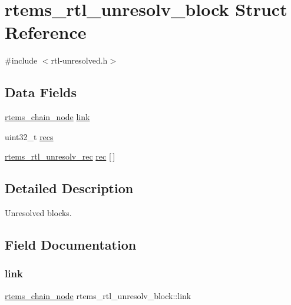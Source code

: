 \hypertarget{structrtems__rtl__unresolv__block}{}\section{rtems\+\_\+rtl\+\_\+unresolv\+\_\+block Struct Reference}
\label{structrtems__rtl__unresolv__block}


{\ttfamily \#include $<$rtl-\/unresolved.\+h$>$}

\subsection*{Data Fields}
\begin{DoxyCompactItemize}
\item 
\mbox{\hyperlink{structChain__Node__struct}{rtems\+\_\+chain\+\_\+node}} \mbox{\hyperlink{structrtems__rtl__unresolv__block_aee34f039d1efe2f7b54da7fd18c033e1}{link}}
\item 
uint32\+\_\+t \mbox{\hyperlink{structrtems__rtl__unresolv__block_aa0fc428e43fb0926b0ac6523b8279b94}{recs}}
\item 
\mbox{\hyperlink{structrtems__rtl__unresolv__rec}{rtems\+\_\+rtl\+\_\+unresolv\+\_\+rec}} \mbox{\hyperlink{structrtems__rtl__unresolv__block_ac222487664347952eab3ab119e8a6b63}{rec}} \mbox{[}$\,$\mbox{]}
\end{DoxyCompactItemize}


\subsection{Detailed Description}
Unresolved blocks. 

\subsection{Field Documentation}
\mbox{\label{structrtems__rtl__unresolv__block_aee34f039d1efe2f7b54da7fd18c033e1}} 
\subsubsection{\texorpdfstring{link}{link}}
{\footnotesize\ttfamily \mbox{\hyperlink{structChain__Node__struct}{rtems\+\_\+chain\+\_\+node}} rtems\+\_\+rtl\+\_\+unresolv\+\_\+block\+::link}

